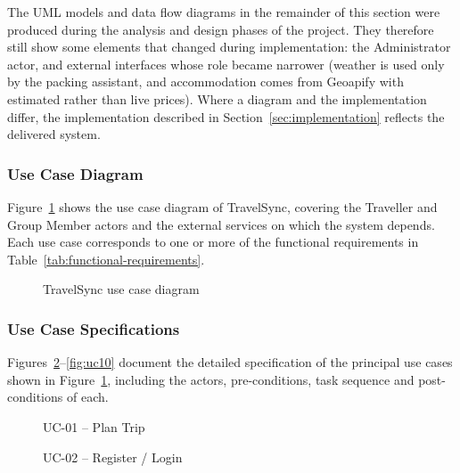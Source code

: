 The UML models and data flow diagrams in the remainder of this section were
produced during the analysis and design phases of the project. They
therefore still show some elements that changed during implementation:
the Administrator actor, and external interfaces whose role became narrower
(weather is used only by the packing assistant, and accommodation comes from
Geoapify with estimated rather than live prices). Where a diagram and the implementation differ, the implementation
described in Section~\ref{sec:implementation} reflects the delivered
system.

\subsubsection{Use Case Diagram}

Figure~\ref{fig:use-case} shows the use case diagram of TravelSync, covering
the Traveller and Group Member actors and the external services on which the
system depends. Each use case corresponds to one or more of the functional
requirements in Table~\ref{tab:functional-requirements}.

\begin{figure}[htbp]
  \centering
  \caption{TravelSync use case diagram}
  \label{fig:use-case}
\end{figure}

\subsubsection{Use Case Specifications}

Figures~\ref{fig:uc01}--\ref{fig:uc10} document the detailed specification
of the principal use cases shown in Figure~\ref{fig:use-case}, including the
actors, pre-conditions, task sequence and post-conditions of each.

\begin{figure}[htbp]
  \centering
  \caption{UC-01 -- Plan Trip}
  \label{fig:uc01}
\end{figure}

\begin{figure}[htbp]
  \centering
  \caption{UC-02 -- Register / Login}
  \label{fig:uc02}
\end{figure}

